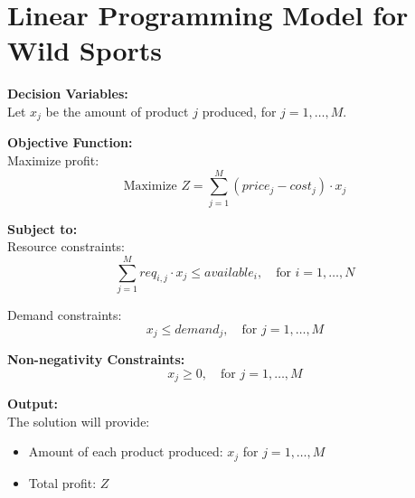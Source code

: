 \documentclass{article}
\begin{document}
\section*{Linear Programming Model for Wild Sports}

\textbf{Decision Variables:} \\
Let \( x_j \) be the amount of product \( j \) produced, for \( j = 1, \ldots, M \).

\textbf{Objective Function:} \\
Maximize profit:
\[
\text{Maximize } Z = \sum_{j=1}^{M} (price_j - cost_j) \cdot x_j
\]

\textbf{Subject to:} \\
Resource constraints:
\[
\sum_{j=1}^{M} req_{i,j} \cdot x_j \leq available_i, \quad \text{for } i = 1, \ldots, N
\]

Demand constraints:
\[
x_j \leq demand_j, \quad \text{for } j = 1, \ldots, M
\]

\textbf{Non-negativity Constraints:} \\
\[
x_j \geq 0, \quad \text{for } j = 1, \ldots, M
\]

\textbf{Output:} \\
The solution will provide:
\begin{itemize}
    \item Amount of each product produced: \( x_j \) for \( j = 1, \ldots, M \)
    \item Total profit: \( Z \)
\end{itemize}
\end{document}
